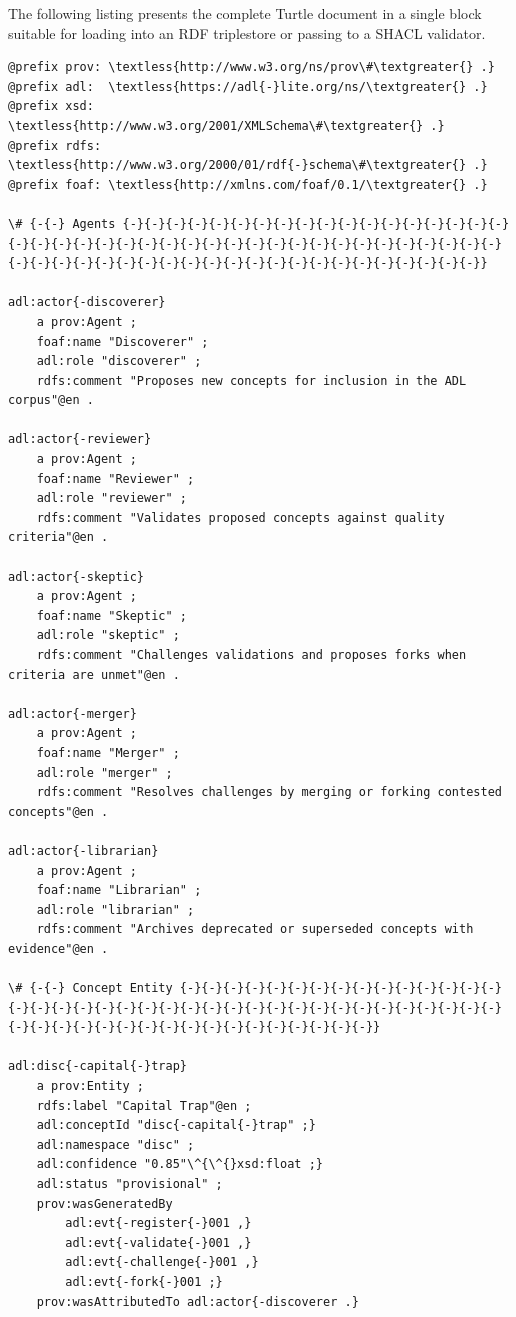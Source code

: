 The following listing presents the complete Turtle document in a single block suitable for loading into an RDF triplestore or passing to a SHACL validator.

\begin{lstlisting}
@prefix prov: \textless{http://www.w3.org/ns/prov\#\textgreater{} .}
@prefix adl:  \textless{https://adl{-}lite.org/ns/\textgreater{} .}
@prefix xsd:  \textless{http://www.w3.org/2001/XMLSchema\#\textgreater{} .}
@prefix rdfs: \textless{http://www.w3.org/2000/01/rdf{-}schema\#\textgreater{} .}
@prefix foaf: \textless{http://xmlns.com/foaf/0.1/\textgreater{} .}

\# {-{-} Agents {-}{-}{-}{-}{-}{-}{-}{-}{-}{-}{-}{-}{-}{-}{-}{-}{-}{-}{-}{-}{-}{-}{-}{-}{-}{-}{-}{-}{-}{-}{-}{-}{-}{-}{-}{-}{-}{-}{-}{-}{-}{-}{-}{-}{-}{-}{-}{-}{-}{-}{-}{-}{-}{-}{-}{-}{-}{-}{-}{-}{-}{-}{-}}

adl:actor{-discoverer}
    a prov:Agent ;
    foaf:name "Discoverer" ;
    adl:role "discoverer" ;
    rdfs:comment "Proposes new concepts for inclusion in the ADL corpus"@en .

adl:actor{-reviewer}
    a prov:Agent ;
    foaf:name "Reviewer" ;
    adl:role "reviewer" ;
    rdfs:comment "Validates proposed concepts against quality criteria"@en .

adl:actor{-skeptic}
    a prov:Agent ;
    foaf:name "Skeptic" ;
    adl:role "skeptic" ;
    rdfs:comment "Challenges validations and proposes forks when criteria are unmet"@en .

adl:actor{-merger}
    a prov:Agent ;
    foaf:name "Merger" ;
    adl:role "merger" ;
    rdfs:comment "Resolves challenges by merging or forking contested concepts"@en .

adl:actor{-librarian}
    a prov:Agent ;
    foaf:name "Librarian" ;
    adl:role "librarian" ;
    rdfs:comment "Archives deprecated or superseded concepts with evidence"@en .

\# {-{-} Concept Entity {-}{-}{-}{-}{-}{-}{-}{-}{-}{-}{-}{-}{-}{-}{-}{-}{-}{-}{-}{-}{-}{-}{-}{-}{-}{-}{-}{-}{-}{-}{-}{-}{-}{-}{-}{-}{-}{-}{-}{-}{-}{-}{-}{-}{-}{-}{-}{-}{-}{-}{-}{-}{-}{-}{-}}

adl:disc{-capital{-}trap}
    a prov:Entity ;
    rdfs:label "Capital Trap"@en ;
    adl:conceptId "disc{-capital{-}trap" ;}
    adl:namespace "disc" ;
    adl:confidence "0.85"\^{\^{}xsd:float ;}
    adl:status "provisional" ;
    prov:wasGeneratedBy
        adl:evt{-register{-}001 ,}
        adl:evt{-validate{-}001 ,}
        adl:evt{-challenge{-}001 ,}
        adl:evt{-fork{-}001 ;}
    prov:wasAttributedTo adl:actor{-discoverer .}


\end{lstlisting}
